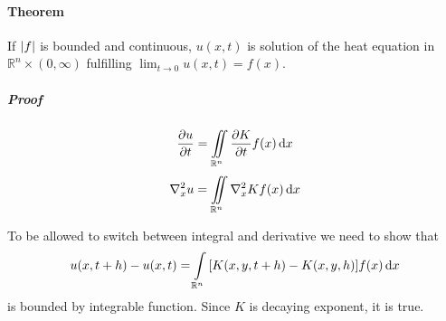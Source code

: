 \paragraph{Theorem} 
If $\abs{f}$ is bounded and continuous, $u(x,t)$ is solution of the heat equation in $\mathbb{R}^n \times (0, \infty)$ fulfilling $\lim_{t\to0} u(x,t) = f(x)$.
\subparagraph{Proof}
$$\pdv{u}{t} = \iint\limits_{\mathbb{R}^n} \pdv{K}{t} f(x) \dd{x}$$
$$\laplacian_x{u} = \iint\limits_{\mathbb{R}^n} \laplacian_x{K} f(x) \dd{x}$$

To be allowed to switch between integral and derivative we need to show that
$$u(x,t+h) - u(x,t) = \int\limits_{\mathbb{R}^n} \qty[K(x,y,t+h) -K(x,y,h) ] f(x) \dd{x}$$
is bounded by integrable function. Since $K$ is decaying exponent, it is true.

